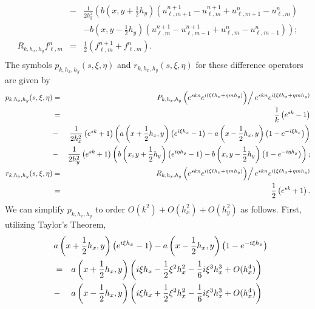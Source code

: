 \documentclass{article}
\begin{document}
\begin{enumerate}
\begin{enumerate}
\begin{eqnarray*}
& - & \frac{1}{2h_y^2} \left( b \left( x, y + \frac{1}{2} h_y \right) \left( u^{n+1}_{\ell,m+1} - u^{n+1}_{\ell,m} + u^n_{\ell,m+1} - u^n_{\ell,m} \right) \right. \\
&   & \left.                - b \left( x, y - \frac{1}{2} h_y \right) \left( u^{n+1}_{\ell,m} - u^{n+1}_{\ell,m-1} + u^n_{\ell,m} - u^n_{\ell,m-1} \right) \right); \\
R_{k,h_x,h_y} f^n_{\ell,m}
& = & \frac{1}{2} \left( f^{n+1}_{\ell,m} + f^n_{\ell,m} \right). \\
\end{eqnarray*}
The symbols \(p_{k,h_x,h_y}(s,\xi,\eta)\) and \(r_{k,h_x,h_y}(s,\xi,\eta)\) for these difference operators are given by
\begin{eqnarray*}
p_{k,h_x,h_y}(s,\xi,\eta)
& = & \left. P_{k,h_x,h_y} \left( e^{skn} e^{i(\xi\ell h_x + \eta mh_y)} \right) \right/ e^{skn} e^{i(\xi\ell h_x + \eta mh_y)} \\
& = & \frac{1}{k} \left( e^{sk} - 1 \right) \\
& - & \frac{1}{2h_x^2} \left( e^{sk} + 1 \right) \left( a \left( x + \frac{1}{2} h_x, y \right) \left( e^{i\xi h_x} - 1 \right) - a \left( x - \frac{1}{2} h_x, y \right) \left( 1 - e^{-i\xi h_x} \right) \right) \\
& - & \frac{1}{2h_y^2} \left( e^{sk} + 1 \right) \left( b \left( x, y + \frac{1}{2} h_y \right) \left( e^{i\eta h_y} - 1 \right) - b \left( x, y - \frac{1}{2} h_y \right) \left( 1 - e^{-i\eta h_y} \right) \right); \\
r_{k,h_x,h_y}(s,\xi,\eta)
& = & \left. R_{k,h_x,h_y} \left( e^{skn} e^{i(\xi\ell h_x + \eta mh_y)} \right) \right/ e^{skn} e^{i(\xi\ell h_x + \eta mh_y)} \\
& = & \frac{1}{2} \left( e^{sk} + 1 \right).
\end{eqnarray*}
We can simplify \(p_{k,h_x,h_y}\) to order \(O(k^2) + O(h_x^2) + O(h_y^2)\) as follows.  First, utilizing Taylor's Theorem,
\begin{eqnarray*}
\lefteqn{a \left( x + \frac{1}{2} h_x, y \right) \left( e^{i\xi h_x} - 1 \right)
       - a \left( x - \frac{1}{2} h_x, y \right) \left( 1 - e^{-i\xi h_x} \right)} \\
& = & a \left( x + \frac{1}{2} h_x, y \right) \left( i\xi h_x - \frac{1}{2} \xi^2 h_x^2 - \frac{1}{6} i\xi^3 h_x^3 + O(h_x^4) \right) \\
& - & a \left( x - \frac{1}{2} h_x, y \right) \left( i\xi h_x + \frac{1}{2} \xi^2 h_x^2 - \frac{1}{6} i\xi^3 h_x^3 + O(h_x^4) \right) \\

\end{eqnarray*}
\end{enumerate}
\end{enumerate}
\end{document}
